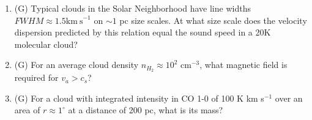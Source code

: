 \documentclass{article}
\begin{document}
\begin{enumerate}
    \begin{enumerate}
        \item (G) Typical clouds in the Solar Neighborhood have line widths $FWHM\approx 1.5 \mathrm{km~s}^{-1}$ on $\sim1$ pc size scales.
            At what size scale does the velocity dispersion predicted by this relation equal the sound speed in a 20K molecular cloud?
        \item (G) For an average cloud density $n_{H_2}\approx10^2$ cm$^{-3}$, what magnetic field is required for $v_{a} > c_s$?
        \item (G) For a cloud with integrated intensity in CO 1-0 of 100 K km s$^{-1}$ over an area of $r\approx1^{\circ}$
            at a distance of 200 pc, what is its mass?

    \end{enumerate}


\end{enumerate}




\end{document}
